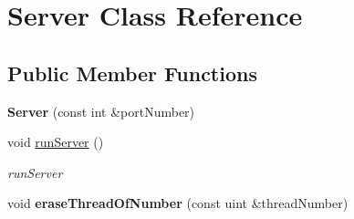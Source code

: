 \hypertarget{classServer}{}\section{Server Class Reference}
\label{classServer}
\subsection*{Public Member Functions}
\begin{DoxyCompactItemize}
\item 
\mbox{\label{classServer_a1a3d683f763e9a89a8f3a001404332e0}} 
{\bfseries Server} (const int \&port\+Number)
\item 
void \hyperlink{classServer_a5dfdd750d32aa4adbb4fdd8ba29b1224}{run\+Server} ()
\begin{DoxyCompactList}\small\item\em run\+Server \end{DoxyCompactList}\item 
\mbox{\label{classServer_a26aa498f27333fbb50bf9911df011f28}} 
void {\bfseries erase\+Thread\+Of\+Number} (const uint \&thread\+Number)
\end{DoxyCompactItemize}
